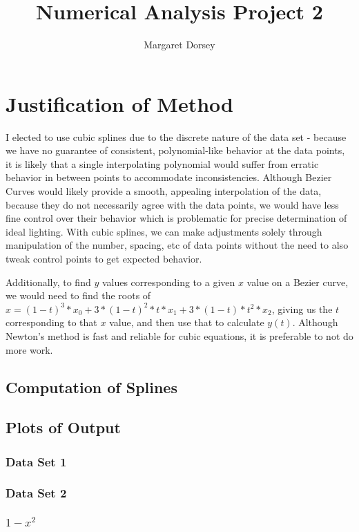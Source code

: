 \documentclass[11pt]{article} %
\title{Numerical Analysis Project 2}
\author{Margaret Dorsey}
\begin{document}
\maketitle

\section*{Justification of Method}
	I elected to use cubic splines due to the discrete nature of the data set - because we have no guarantee of consistent, polynomial-like behavior at the data points, it is likely that a single interpolating polynomial would suffer from erratic behavior in between points to accommodate inconsistencies. Although Bezier Curves would likely provide a smooth, appealing interpolation of the data, because they do not necessarily agree with the data points, we would have less fine control over their behavior which is problematic for precise determination of ideal lighting. With  cubic splines, we can make adjustments solely through manipulation of the number, spacing, etc of data points without the need to also tweak control points to get expected behavior.
\par Additionally, to find $y$ values corresponding to a given $x$ value on a Bezier curve, we would need to find the roots of $x = (1-t)^3*x_0 + 3*(1-t)^2*t*x_1 + 3*(1-t)*t^2*x_2$, giving us the $t$ corresponding to that $x$ value, and then use that to calculate $y(t)$. Although Newton's method is fast and reliable for cubic equations, it is preferable to not do more work.

\subsection*{Computation of Splines}

\subsection*{Plots of Output}
\subsubsection*{Data Set 1}
\subsubsection*{Data Set 2}
\subsubsection*{$1-x^2$}
\end{document}
